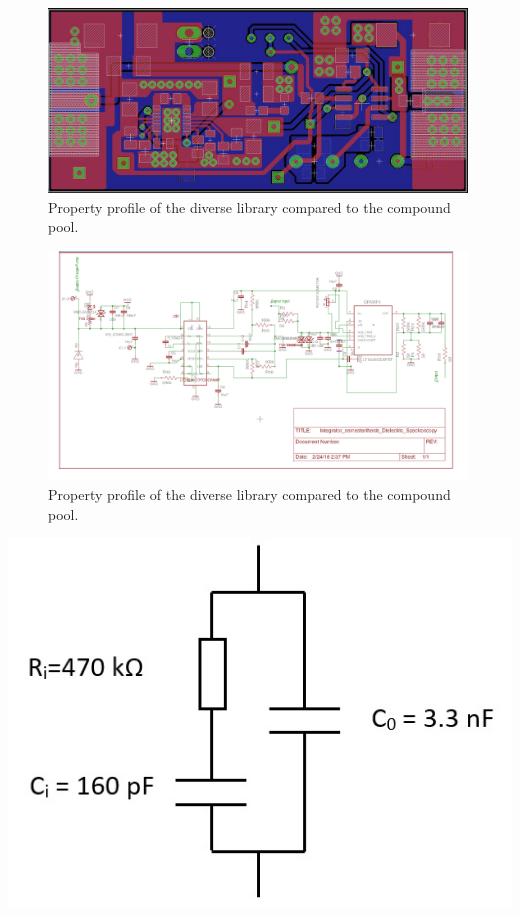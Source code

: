 \begin{figure}
\includegraphics[width=0.99\textwidth]{figures/Method/integrator/PCB_Integrator.png}
    \caption{Property profile of the diverse library compared to the compound pool.}
    
    \end{figure}	
    
    
    \newpage
    
    	\begin{figure}
\includegraphics[width=0.99\textwidth]{figures/Method/integrator/schematic.jpg}
 \caption{Property profile of the diverse library compared to the compound pool.}
  \end{figure}	




\includegraphics{figures/Methods/debye-modell.jpg}		
